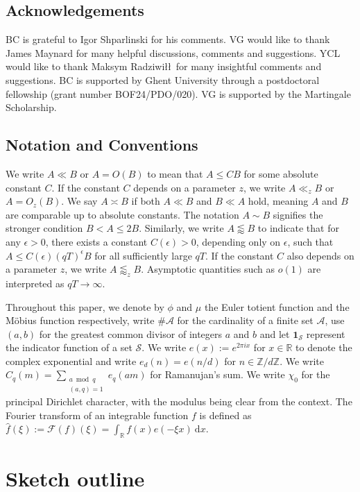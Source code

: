 \documentclass[12pt]{amsart}
\theoremstyle{definition}
\theoremstyle{plain}
\theoremstyle{remark}
\numberwithin{equation}{section}
\numberwithin{theorem}{section}
\newcommand{\Z}{\mathbb{Z}}
\numberwithin{equation}{section}
\begin{document}
	
	
	\subsection*{Acknowledgements} BC is grateful to Igor Shparlinski for his comments. VG would like to thank James Maynard for many helpful discussions, comments and suggestions. YCL would like to thank Maksym Radziwi\l\l \ for many insightful comments and suggestions. BC is supported by Ghent University through a postdoctoral fellowship (grant number BOF24/PDO/020). VG is supported by the Martingale Scholarship.
	
	\subsection{Notation and Conventions}\label{not}
	We write $A \ll B$ or $A=O(B)$ to mean that $A \leq CB$ for some absolute constant $C$. If the constant $C$ depends on a parameter $z$, we write
	$A \ll_{z} B$ or $A=O_{z}(B)$. We say $A \asymp B$ if both $A \ll B$ and $B \ll A$ hold, meaning $A$ and $B$ are comparable up to absolute constants. The notation $A \sim B$ signifies the stronger condition $B<A \leq2B$. Similarly, we write $A \lessapprox B$ to indicate that for any $\epsilon > 0$, there exists a constant $C(\epsilon) > 0$, depending only on $\epsilon$, such that $A \leq C(\epsilon)(qT)^{\epsilon} B$ for all sufficiently large $qT$. If the constant $C$ also depends on a parameter $z$, we write $A \lessapprox_{z}B$. Asymptotic quantities such as $o(1)$ are interpreted as $qT \to \infty$.
	
	Throughout this paper, we denote by $\phi$ and $\mu$ the Euler totient function and the Möbius function respectively, write $\#\mathcal{A}$ for the cardinality of a finite set $\mathcal{A}$, use $(a,b)$ for the greatest common divisor of integers $a$ and $b$ and let $\mathbf{1}_{\mathcal{S}}$ represent the indicator function of a set $\mathcal{S}$. We write $e(x):=e^{2\pi i x}$ for $x \in \mathbb{R}$ to denote the complex exponential and write $e_d(n)=e(n/d)$ for $n \in \mathbb{Z}/d\Z$. We write $C_q(m)=\sum_{\substack{a \bmod q\\ (a,q)=1}}
	e_q(am)$ for Ramanujan's sum. We write $\chi_0$ for the principal Dirichlet character, with the modulus being clear from the context. The Fourier transform of an integrable function $f$ is defined as $\hat{f}(\xi):=\mathcal{F}(f)(\xi)= \int_{\mathbb{R}} f(x)e(-\xi x)\:\mathrm{d}x$.  
	
	\section{Sketch outline}
	
\end{document}
